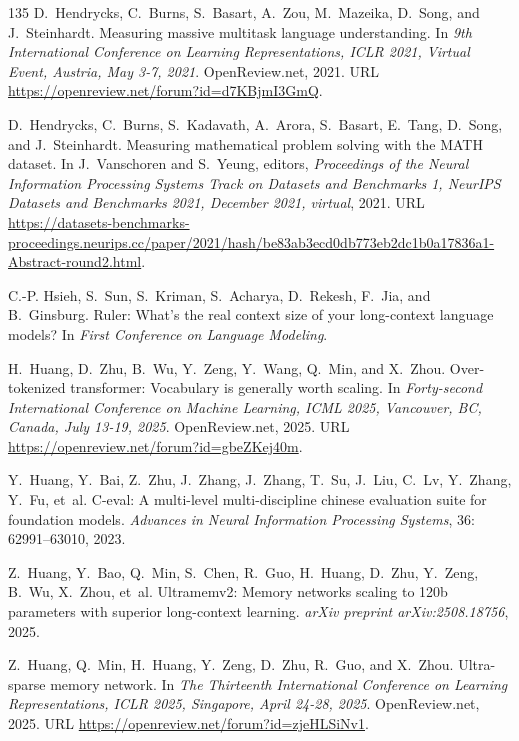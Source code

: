 \begin{thebibliography}{135}
D.~Hendrycks, C.~Burns, S.~Basart, A.~Zou, M.~Mazeika, D.~Song, and
  J.~Steinhardt.
\newblock Measuring massive multitask language understanding.
\newblock In \emph{9th International Conference on Learning Representations,
  {ICLR} 2021, Virtual Event, Austria, May 3-7, 2021}. OpenReview.net,
  2021{}.
\newblock URL \url{https://openreview.net/forum?id=d7KBjmI3GmQ}.

D.~Hendrycks, C.~Burns, S.~Kadavath, A.~Arora, S.~Basart, E.~Tang, D.~Song, and
  J.~Steinhardt.
\newblock Measuring mathematical problem solving with the {MATH} dataset.
\newblock In J.~Vanschoren and S.~Yeung, editors, \emph{Proceedings of the
  Neural Information Processing Systems Track on Datasets and Benchmarks 1,
  NeurIPS Datasets and Benchmarks 2021, December 2021, virtual},
  2021{}.
\newblock URL
  \url{https://datasets-benchmarks-proceedings.neurips.cc/paper/2021/hash/be83ab3ecd0db773eb2dc1b0a17836a1-Abstract-round2.html}.

C.-P. Hsieh, S.~Sun, S.~Kriman, S.~Acharya, D.~Rekesh, F.~Jia, and B.~Ginsburg.
\newblock Ruler: What’s the real context size of your long-context language
  models?
\newblock In \emph{First Conference on Language Modeling}.

H.~Huang, D.~Zhu, B.~Wu, Y.~Zeng, Y.~Wang, Q.~Min, and X.~Zhou.
\newblock Over-tokenized transformer: Vocabulary is generally worth scaling.
\newblock In \emph{Forty-second International Conference on Machine Learning,
  {ICML} 2025, Vancouver, BC, Canada, July 13-19, 2025}. OpenReview.net,
  2025{}.
\newblock URL \url{https://openreview.net/forum?id=gbeZKej40m}.

Y.~Huang, Y.~Bai, Z.~Zhu, J.~Zhang, J.~Zhang, T.~Su, J.~Liu, C.~Lv, Y.~Zhang,
  Y.~Fu, et~al.
\newblock C-eval: A multi-level multi-discipline chinese evaluation suite for
  foundation models.
\newblock \emph{Advances in Neural Information Processing Systems},
  36: 62991--63010, 2023.

Z.~Huang, Y.~Bao, Q.~Min, S.~Chen, R.~Guo, H.~Huang, D.~Zhu, Y.~Zeng, B.~Wu,
  X.~Zhou, et~al.
\newblock Ultramemv2: Memory networks scaling to 120b parameters with superior
  long-context learning.
\newblock \emph{arXiv preprint arXiv:2508.18756}, 2025{}.

Z.~Huang, Q.~Min, H.~Huang, Y.~Zeng, D.~Zhu, R.~Guo, and X.~Zhou.
\newblock Ultra-sparse memory network.
\newblock In \emph{The Thirteenth International Conference on Learning
  Representations, {ICLR} 2025, Singapore, April 24-28, 2025}. OpenReview.net,
  2025{}.
\newblock URL \url{https://openreview.net/forum?id=zjeHLSiNv1}.


\end{thebibliography}

